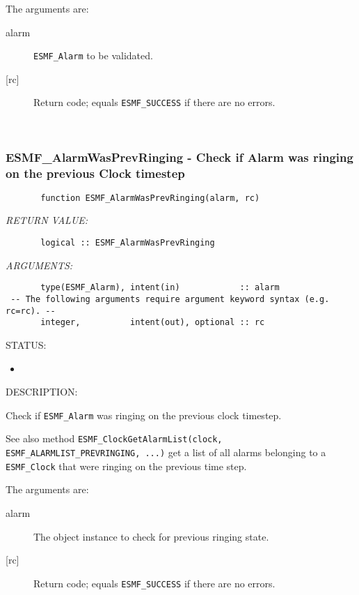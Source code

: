        The arguments are:
       \begin{description}
       \item[alarm]
            {\tt ESMF\_Alarm} to be validated.
       \item[{[rc]}]
            Return code; equals {\tt ESMF\_SUCCESS} if there are no errors.
       \end{description}
   
 
\mbox{}\hrulefill\ 
 
\subsubsection [ESMF\_AlarmWasPrevRinging] {ESMF\_AlarmWasPrevRinging - Check if Alarm was ringing on the previous Clock timestep}


 
\begin{verbatim}       function ESMF_AlarmWasPrevRinging(alarm, rc)\end{verbatim}{\em RETURN VALUE:}
\begin{verbatim}       logical :: ESMF_AlarmWasPrevRinging
 \end{verbatim}{\em ARGUMENTS:}
\begin{verbatim}       type(ESMF_Alarm), intent(in)            :: alarm
 -- The following arguments require argument keyword syntax (e.g. rc=rc). --
       integer,          intent(out), optional :: rc
 \end{verbatim}
{\sf STATUS:}
   \begin{itemize}
   \item{}
   \end{itemize}
  
{\sf DESCRIPTION:\\ }


       Check if {\tt ESMF\_Alarm} was ringing on the previous clock timestep.
  
       See also method
         {\tt ESMF\_ClockGetAlarmList(clock, ESMF\_ALARMLIST\_PREVRINGING, ...)}
       get a list of all alarms belonging to a {\tt ESMF\_Clock} that were
       ringing on the previous time step.
  
       The arguments are:
       \begin{description}
       \item[alarm]
            The object instance to check for previous ringing state.
       \item[{[rc]}]
            Return code; equals {\tt ESMF\_SUCCESS} if there are no errors.
       \end{description} 
 
